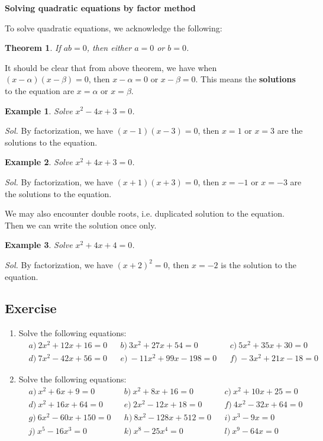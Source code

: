 \documentclass[12pt]{article}
\newtheorem*{theorem}{Theorem}
\newtheorem{example}{Example}
\begin{document}
    \begin{center}
        \textbf{Solving quadratic equations by factor method}
    \end{center}

    To solve quadratic equations, we acknowledge the following:\begin{theorem}
        If $ab=0$, then either $a=0$ or $b=0$.
    \end{theorem}

    It should be clear that from above theorem, we have when $(x-\alpha)(x-\beta)=0$, then $x-\alpha=0$ or $x-\beta=0$. This means the \textbf{solutions} to the equation are $x=\alpha$ or $x=\beta$.

    \begin{example}
        Solve $x^2-4x+3=0$.
    \end{example}

    \textit{ Sol. }By factorization, we have $(x-1)(x-3)=0$, then $x=1$ or $x=3$ are the solutions to the equation.

    \begin{example}
        Solve $x^2+4x+3=0$.
    \end{example}

    \textit{ Sol. }By factorization, we have $(x+1)(x+3)=0$, then $x=-1$ or $x=-3$ are the solutions to the equation.

    We may also encounter double roots, i.e. duplicated solution to the equation. Then we can write the solution once only.

    \begin{example}
        Solve $x^2+4x+4=0$.
    \end{example}

    \textit{ Sol. }By factorization, we have $(x+2)^2=0$, then $x=-2$ is the solution to the equation.

    \subsection*{Exercise}
    \begin{enumerate}
        \item Solve the following equations:\begin{align*}
            &a)\ 2x^2+12x+16=0&&b)\ 3x^2+27x+54=0&&c)\ 5x^2+35x+30=0\\
            &d)\ 7x^2-42x+56=0&&e)\ -11x^2+99x-198=0&&f)\ -3x^2+21x-18=0
        \end{align*}
        \item Solve the following equations:\begin{align*}
            &a)\ x^2+6x+9=0&&b)\ x^2+8x+16=0&&c)\ x^2+10x+25=0\\
            &d)\ x^2+16x+64=0&&e)\ 2x^2-12x+18=0&&f)\ 4x^2-32x+64=0\\
            &g)\ 6x^2-60x+150=0&&h)\ 8x^2-128x+512=0&&i)\ x^3-9x=0\\
            &j)\ x^5-16x^3=0&&k)\ x^8-25x^4=0&&l)\ x^9-64x=0
        \end{align*}
    \end{enumerate}
\end{document}
